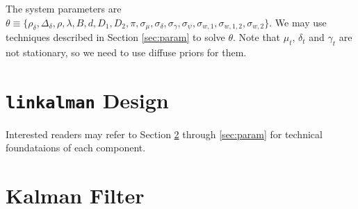 \documentclass[10pt, titlepage]{article}
\numberwithin{equation}{section}
\begin{document}
The system parameters are $\theta\equiv\{\rho_{\delta}, \Delta_{\delta}, \rho, \lambda, B, d, D_1, D_2, \pi, \sigma_{\mu}, \sigma_{\delta}, \sigma_{\gamma}, \sigma_{\psi}, \sigma_{w,1}, \sigma_{w,1,2}, \sigma_{w,2}\}$. We may use techniques described in Section \ref{sec:param} to solve $\theta$. Note that $\mu_t$, $\delta_t$ and $\gamma_{t}$ are not stationary, so we need to use diffuse priors for them. 

\section{\texttt{linkalman} Design} \label{sec:codebase}
Interested readers may refer to Section \ref{sec:filter} through \ref{sec:param} for technical foundataions of each component. 

\section{Kalman Filter} \label{sec:filter}
\end{document}
